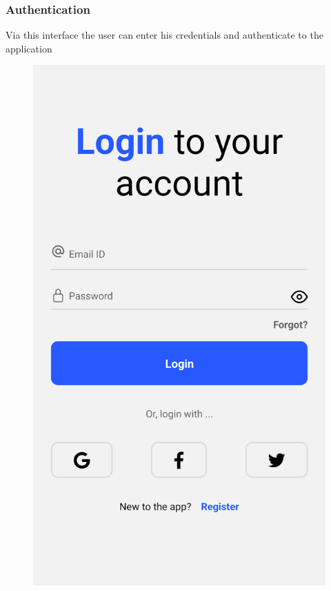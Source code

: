 \subsubsection{Authentication}
Via this interface the user can enter his credentials and authenticate to the application 
\begin{figure}[H]
\begin{minipage}{0.45\textwidth}
    \centering
    \includegraphics[width=\linewidth]{images/chap2/LoginForm.png}

\end{minipage}
\end{figure}
